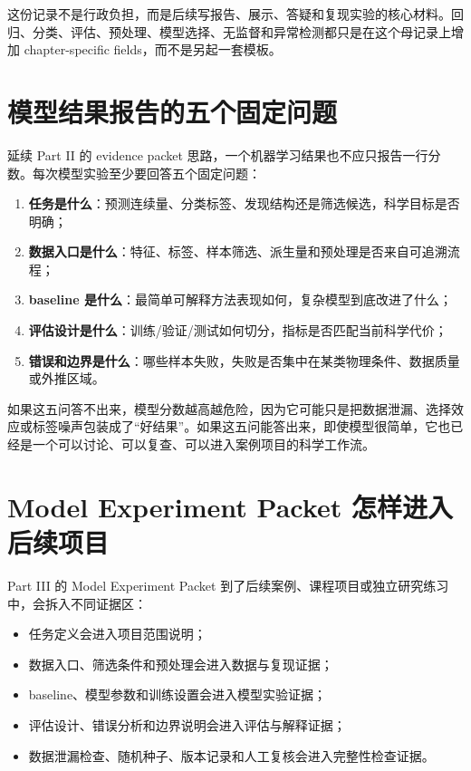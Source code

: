 这份记录不是行政负担，而是后续写报告、展示、答疑和复现实验的核心材料。回归、分类、评估、预处理、模型选择、无监督和异常检测都只是在这个母记录上增加 chapter-specific fields，而不是另起一套模板。

\section*{模型结果报告的五个固定问题}

延续 Part II 的 evidence packet 思路，一个机器学习结果也不应只报告一行分数。每次模型实验至少要回答五个固定问题：

\begin{enumerate}
    \item \textbf{任务是什么}：预测连续量、分类标签、发现结构还是筛选候选，科学目标是否明确；
    \item \textbf{数据入口是什么}：特征、标签、样本筛选、派生量和预处理是否来自可追溯流程；
    \item \textbf{baseline 是什么}：最简单可解释方法表现如何，复杂模型到底改进了什么；
    \item \textbf{评估设计是什么}：训练/验证/测试如何切分，指标是否匹配当前科学代价；
    \item \textbf{错误和边界是什么}：哪些样本失败，失败是否集中在某类物理条件、数据质量或外推区域。
\end{enumerate}

如果这五问答不出来，模型分数越高越危险，因为它可能只是把数据泄漏、选择效应或标签噪声包装成了“好结果”。如果这五问能答出来，即使模型很简单，它也已经是一个可以讨论、可以复查、可以进入案例项目的科学工作流。

\section*{Model Experiment Packet 怎样进入后续项目}

Part III 的 Model Experiment Packet 到了后续案例、课程项目或独立研究练习中，会拆入不同证据区：

\begin{itemize}
    \item 任务定义会进入项目范围说明；
    \item 数据入口、筛选条件和预处理会进入数据与复现证据；
    \item baseline、模型参数和训练设置会进入模型实验证据；
    \item 评估设计、错误分析和边界说明会进入评估与解释证据；
    \item 数据泄漏检查、随机种子、版本记录和人工复核会进入完整性检查证据。
\end{itemize}

